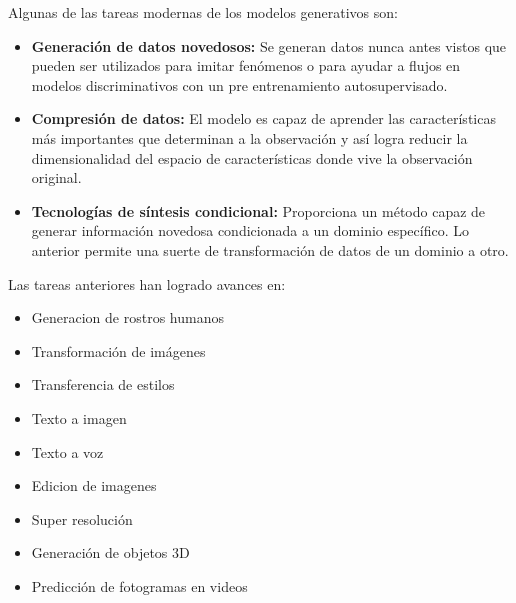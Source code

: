 Algunas de las tareas modernas de los modelos generativos son:

\begin{itemize}
    \item \textbf{Generación de datos novedosos:} Se generan datos nunca antes vistos que pueden ser utilizados para imitar fenómenos o para ayudar a flujos en modelos discriminativos con un pre entrenamiento autosupervisado.
    \item \textbf{Compresión de datos:} El modelo es capaz de aprender las características más importantes que determinan a la observación y así logra reducir la dimensionalidad del espacio de características donde vive la observación original. 
    \item \textbf{Tecnologías de síntesis condicional:} Proporciona un método capaz de generar información novedosa condicionada a un dominio específico. Lo anterior permite una suerte de transformación de datos de un dominio a otro. 
\end{itemize}

Las tareas anteriores han logrado avances en:

\begin{itemize}
    \item Generacion de rostros humanos
    \item Transformación de imágenes
    \item Transferencia de estilos
    \item Texto a imagen
    \item Texto a voz
    \item Edicion de imagenes
    \item Super resolución
    \item Generación de objetos 3D
    \item Predicción de fotogramas en videos
\end{itemize}